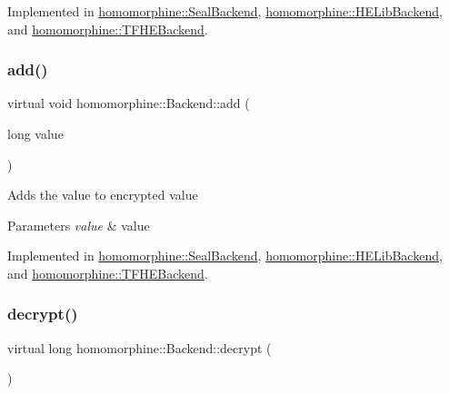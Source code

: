 Implemented in \mbox{\hyperlink{classhomomorphine_1_1_seal_backend_ae868a22dda1eed2246c59aa831707bf1}{homomorphine\+::\+Seal\+Backend}}, \mbox{\hyperlink{classhomomorphine_1_1_h_e_lib_backend_a1e3c4745d7efdaac1f75c5a7fbfc3707}{homomorphine\+::\+H\+E\+Lib\+Backend}}, and \mbox{\hyperlink{classhomomorphine_1_1_t_f_h_e_backend_a801757870101bdb66ced26e3f8060694}{homomorphine\+::\+T\+F\+H\+E\+Backend}}.

\mbox{\label{classhomomorphine_1_1_backend_a7175812578b22d9ff19d49760cb04b26}} 
\subsubsection{\texorpdfstring{add()}{add()}\hspace{0.1cm}{\footnotesize\ttfamily [2/2]}}
{\footnotesize\ttfamily virtual void homomorphine\+::\+Backend\+::add (\begin{DoxyParamCaption}\item[{long}]{value }\end{DoxyParamCaption})\hspace{0.3cm}{\ttfamily [pure virtual]}}

Adds the value to encrypted value


\begin{DoxyParams}{Parameters}
{\em value} & value \\
\hline
\end{DoxyParams}


Implemented in \mbox{\hyperlink{classhomomorphine_1_1_seal_backend_acbff51d94165f4e578cafaeb965e4367}{homomorphine\+::\+Seal\+Backend}}, \mbox{\hyperlink{classhomomorphine_1_1_h_e_lib_backend_a6cc00dcfc209206e67c7237934cb8d82}{homomorphine\+::\+H\+E\+Lib\+Backend}}, and \mbox{\hyperlink{classhomomorphine_1_1_t_f_h_e_backend_a0bf6a35d4156416d8c1b86f71ca71b75}{homomorphine\+::\+T\+F\+H\+E\+Backend}}.

\mbox{\label{classhomomorphine_1_1_backend_ae5c5de7bddabef1bd9a935be5bbd9646}} 
\subsubsection{\texorpdfstring{decrypt()}{decrypt()}}
{\footnotesize\ttfamily virtual long homomorphine\+::\+Backend\+::decrypt (\begin{DoxyParamCaption}{ }\end{DoxyParamCaption})\hspace{0.3cm}{\ttfamily [pure virtual]}}

